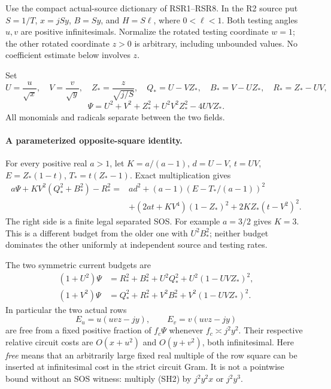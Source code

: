 Use the compact actual-source dictionary of RSR1--RSR8.  In the R2
source put \(S=1/T\), \(x=jSy\), \(B=Sy\), and \(H=S\ell\), where
\(0<\ell<1\).  Both testing angles \(u,v\) are positive
infinitesimals.  Normalize the rotated testing coordinate \(w=1\);
the other rotated coordinate \(z>0\) is arbitrary, including
unbounded values.  No coefficient estimate below involves \(z\).

Set
\[
 U=\frac{u}{\sqrt x},\quad V=\frac v{\sqrt y},\quad
 Z_*=\frac z{\sqrt{j/S}},\quad
 Q_*=U-VZ_*,\quad B_*=V-UZ_*,\quad R_*=Z_*-UV,
\]
\[
 \Psi=U^2+V^2+Z_*^2+U^2V^2Z_*^2-4UVZ_*.
\]
All monomials and radicals separate between the two fields.

\paragraph{A parameterized opposite-square identity.}
For every positive real \(a>1\), let \(K=a/(a-1)\),
\(d=U-V\), \(t=UV\), \(E=Z_*(1-t)\), \(T_*=t(Z_*-1)\).
Exact multiplication gives
\[
\begin{split}
 a\Psi+K V^2(Q_*^2+B_*^2)-R_*^2
 ={}&a d^2+(a-1)(E-T_*/(a-1))^2\\
 &+(2at+KV^4)(1-Z_*)^2+2KZ_*(t-V^2)^2 .
\end{split}                                                     \tag{SH1}
\]
The right side is a finite legal separated SOS.  For example
\(a=3/2\) gives \(K=3\).  This is a different budget from the
older one with \(U^2B_*^2\); neither budget dominates the other
uniformly at independent source and testing rates.

The two symmetric current budgets are
\[
\begin{split}
 (1+U^2)\Psi&=R_*^2+B_*^2+U^2Q_*^2
                         +U^2(1-UVZ_*)^2,\\
 (1+V^2)\Psi&=Q_*^2+R_*^2+V^2B_*^2
                         +V^2(1-UVZ_*)^2 .
\end{split}                                                     \tag{SH2}
\]
In particular the two actual rows
\[
 E_u=u(uvz-jy),\qquad E_v=v(uvz-jy)                       \tag{SH3}
\]
are free from a fixed positive fraction of \(f_c\Psi\) whenever
\(f_c\asymp j^2y^2\).  Their respective relative circuit costs
are \(O(x+u^2)\) and \(O(y+v^2)\), both infinitesimal.  Here
\emph{free} means that an arbitrarily large fixed real multiple of
the row square can be inserted at infinitesimal cost in the
strict circuit Gram.  It is not a pointwise bound without an
SOS witness: multiply (SH2) by \(j^2y^2x\) or \(j^2y^3\).

